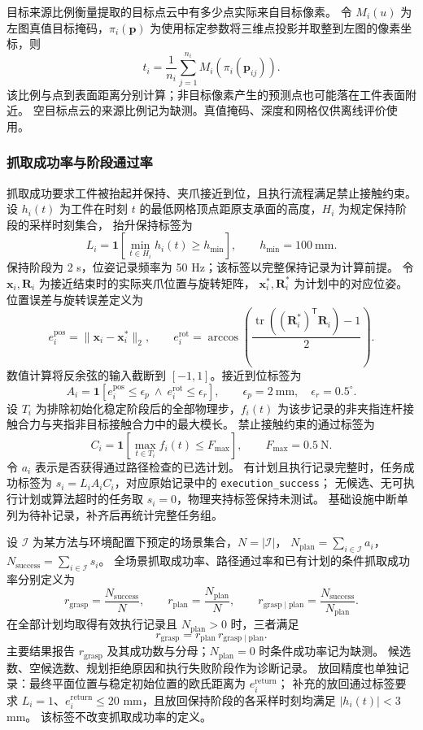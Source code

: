 \documentclass[UTF8,fontset=fandol,a4paper,11pt]{ctexart}
\begin{document}
目标来源比例衡量提取的目标点云中有多少点实际来自目标像素。
令 $M_i(u)$ 为左图真值目标掩码，$\pi_i(\mathbf p)$ 为使用标定参数将三维点投影并取整到左图的像素坐标，则
\[
 t_i=\frac{1}{n_i}\sum_{j=1}^{n_i}M_i\!\left(\pi_i(\mathbf p_{ij})\right).
\]
该比例与点到表面距离分别计算；非目标像素产生的预测点也可能落在工件表面附近。
空目标点云的来源比例记为缺测。真值掩码、深度和网格仅供离线评价使用。

\subsubsection{抓取成功率与阶段通过率}

抓取成功要求工件被抬起并保持、夹爪接近到位，且执行流程满足禁止接触约束。
设 $h_i(t)$ 为工件在时刻 $t$ 的最低网格顶点距原支承面的高度，$H_i$ 为规定保持阶段的采样时刻集合，
抬升保持标签为
\[
 L_i=\mathbf{1}\!\left[\min_{t\in H_i}h_i(t)\geq h_{\min}\right],
 \qquad h_{\min}=100\ \mathrm{mm}.
\]
保持阶段为 2 s，位姿记录频率为 50 Hz；该标签以完整保持记录为计算前提。
令 $\mathbf x_i,\mathbf R_i$ 为接近结束时的实际夹爪位置与旋转矩阵，
$\mathbf x_i^*,\mathbf R_i^*$ 为计划中的对应位姿。位置误差与旋转误差定义为
\[
 e_i^{\mathrm{pos}}=\|\mathbf x_i-\mathbf x_i^*\|_2,
 \qquad
 e_i^{\mathrm{rot}}=\arccos\!\left(\frac{\operatorname{tr}((\mathbf R_i^*)^{\mathsf T}\mathbf R_i)-1}{2}\right).
\]
数值计算将反余弦的输入截断到 $[-1,1]$。接近到位标签为
\[
 A_i=\mathbf{1}[e_i^{\mathrm{pos}}\leq\epsilon_p\ \land\ e_i^{\mathrm{rot}}\leq\epsilon_r],
 \qquad \epsilon_p=2\ \mathrm{mm},\quad\epsilon_r=0.5^\circ.
\]
设 $T_i$ 为排除初始化稳定阶段后的全部物理步，$f_i(t)$ 为该步记录的非夹指连杆接触合力与夹指非目标接触合力中的最大模长。
禁止接触约束的通过标签为
\[
 C_i=\mathbf{1}\!\left[\max_{t\in T_i}f_i(t)\leq F_{\max}\right],
 \qquad F_{\max}=0.5\ \mathrm N.
\]
令 $a_i$ 表示是否获得通过路径检查的已选计划。
有计划且执行记录完整时，任务成功标签为 $s_i=L_iA_iC_i$，对应原始记录中的 \texttt{execution\_success}；
无候选、无可执行计划或算法超时的任务取 $s_i=0$，物理夹持标签保持未测试。
基础设施中断单列为待补记录，补齐后再统计完整任务组。

设 $\mathcal I$ 为某方法与环境配置下预定的场景集合，$N=|\mathcal I|$，
$N_{\mathrm{plan}}=\sum_{i\in\mathcal I}a_i$，$N_{\mathrm{success}}=\sum_{i\in\mathcal I}s_i$。
全场景抓取成功率、路径通过率和已有计划的条件抓取成功率分别定义为
\[
 r_{\mathrm{grasp}}=\frac{N_{\mathrm{success}}}{N},
 \qquad r_{\mathrm{plan}}=\frac{N_{\mathrm{plan}}}{N},
 \qquad r_{\mathrm{grasp}\mid\mathrm{plan}}=\frac{N_{\mathrm{success}}}{N_{\mathrm{plan}}}.
\]
在全部计划均取得有效执行记录且 $N_{\mathrm{plan}}>0$ 时，三者满足
\[
 r_{\mathrm{grasp}}=r_{\mathrm{plan}}\,r_{\mathrm{grasp}\mid\mathrm{plan}}.
\]
主要结果报告 $r_{\mathrm{grasp}}$ 及其成功数与分母；$N_{\mathrm{plan}}=0$ 时条件成功率记为缺测。
候选数、空候选数、规划拒绝原因和执行失败阶段作为诊断记录。
放回精度也单独记录：最终平面位置与稳定初始位置的欧氏距离为 $e_i^{\mathrm{return}}$；
补充的放回通过标签要求 $L_i=1$、$e_i^{\mathrm{return}}\leq20$ mm，且放回保持阶段的各采样时刻均满足 $|h_i(t)|<3$ mm。
该标签不改变抓取成功率的定义。
\end{document}
